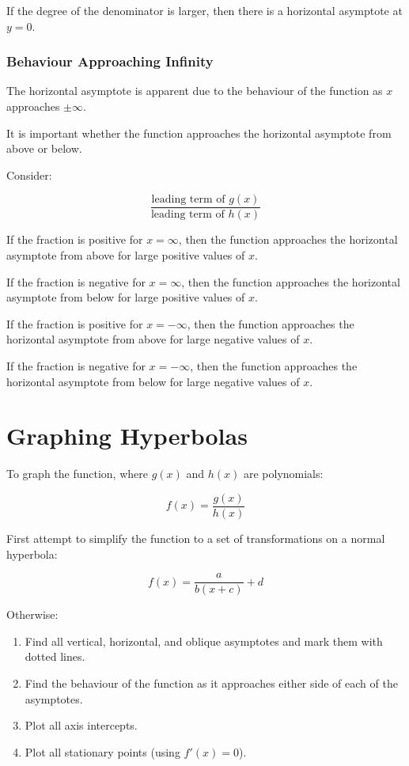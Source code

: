 \documentclass[a4paper,11pt]{article}
\begin{document}
If the degree of the denominator is larger, then there is a horizontal
asymptote at $y = 0$.


\subsubsection{Behaviour Approaching Infinity}

The horizontal asymptote is apparent due to the behaviour of the function as
$x$ approaches $\pm \infty$.

It is important whether the function approaches the horizontal asymptote from
above or below.

Consider:

$$
\frac{\text{leading term of $g(x)$}}{\text{leading term of $h(x)$}}
$$

If the fraction is positive for $x = \infty$, then the function approaches the
horizontal asymptote from above for large positive values of $x$.

If the fraction is negative for $x = \infty$, then the function approaches the
horizontal asymptote from below for large positive values of $x$.

If the fraction is positive for $x = -\infty$, then the function approaches the
horizontal asymptote from above for large negative values of $x$.

If the fraction is negative for $x = -\infty$, then the function approaches the
horizontal asymptote from below for large negative values of $x$.




\section{Graphing Hyperbolas}

To graph the function, where $g(x)$ and $h(x)$ are polynomials:

$$
f(x) = \frac{g(x)}{h(x)}
$$

First attempt to simplify the function to a set of transformations on a normal
hyperbola:

$$
f(x) = \frac{a}{b(x + c)} + d
$$

Otherwise:

\begin{enumerate}
\item Find all vertical, horizontal, and oblique asymptotes and mark them with
	dotted lines.
\item Find the behaviour of the function as it approaches either side of each
	of the asymptotes.
\item Plot all axis intercepts.
\item Plot all stationary points (using $f'(x) = 0$).
\end{enumerate}
\end{document}
